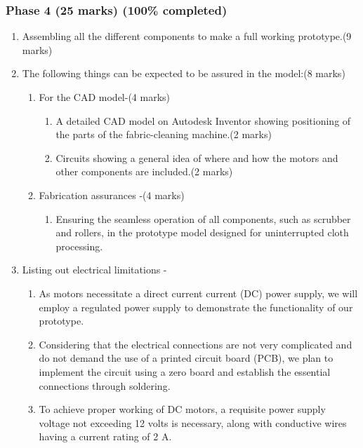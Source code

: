 \documentclass[table,french,english]{rapportCS}
\begin{document}
\subsubsection*{Phase 4 (25 marks) (100\% completed)}
\begin{enumerate}[label=\arabic*.]
    \item  Assembling all the different components to make a full working  \gls{prototype}.(9 marks)
    \item  The following things can be expected to be assured in the model:(8 marks)
    \begin{enumerate}[label=\alph*.]
        \item For the CAD model-(4 marks)
        \begin{enumerate}[label=\roman*.]
            \item A detailed CAD model on Autodesk Inventor showing positioning of the parts of the fabric-cleaning machine.(2 marks)
            \item Circuits showing a general idea of where and how the motors and other components are included.(2 marks)
            \end{enumerate}
        \item Fabrication assurances -(4 marks)
        \begin{enumerate}[label=\roman*.]
           \item Ensuring the seamless operation of all components, such as  \gls{scrubber} and rollers, in the  \gls{prototype} model designed for uninterrupted cloth processing.
           \end{enumerate}
        \end{enumerate}
\newpage
\item Listing out electrical limitations -
    \begin{enumerate}[label=\alph*.]
        \item As motors necessitate a direct current \gls{current} (DC) power supply, we will employ a regulated power supply to demonstrate the functionality of our prototype.
        \item Considering that the electrical connections are not very complicated and do not demand the use of a printed circuit board (PCB), we plan to implement the circuit using a zero board and establish the essential connections through soldering.
        \item To achieve proper working of DC motors, a requisite power supply voltage not exceeding 12 volts is necessary, along with conductive wires having a current rating of 2 A.
        \end{enumerate}
        

\end{enumerate}
\end{document}
